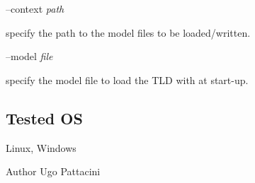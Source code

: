 --context {\itshape path} 
\begin{DoxyItemize}
\item specify the path to the model files to be loaded/written.
\end{DoxyItemize}

--model {\itshape file} 
\begin{DoxyItemize}
\item specify the model file to load the T\+L\+D with at start-\/up.
\end{DoxyItemize}\hypertarget{group__icub__tld_tested_os_sec}{}\subsection{Tested O\+S}\label{group__icub__tld_tested_os_sec}
Linux, Windows

\begin{DoxyAuthor}{Author}
Ugo Pattacini 
\end{DoxyAuthor}
